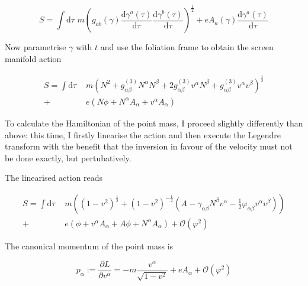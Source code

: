 \documentclass[11pt]{article}
\begin{document}
\begin{equation}
	S = \int \mathrm{d}\tau  \, \, 
	m \left( 
	g_{a b}\left( \gamma \right)
	\frac{\mathrm{d} \gamma^a\left( \tau \right) }{\mathrm{d}\tau}
	\frac{\mathrm{d} \gamma^b\left( \tau \right) }{\mathrm{d}\tau} \right)^{\frac{1}{2}}
	+ e A_a \left( \gamma  \right) 
	\frac{\mathrm{d} \gamma^a\left( \tau \right) }{\mathrm{d}\tau} 
\end{equation}

Now parametrise $\gamma$ with $t$ and use the foliation frame to obtain the screen manifold action

\begin{equation}
\begin{split}
	S = \int \mathrm{d}\tau  \, \, 
	& m \left( 
	N^2 + g^{(3)}_{\alpha \beta} N^{\alpha} N^{\beta}
	+ 2 g^{(3)}_{\alpha \beta} v^\alpha N^\beta + g^{(3)}_{\alpha \beta} v^\alpha v^\beta 
	\right)^{\frac{1}{2}} \\
	+ \, & e \left( N \phi + N^\alpha A_\alpha + v^\alpha A_\alpha \right)
\end{split}
\end{equation}

To calculate the Hamiltonian of the point mass, I proceed slightly differently than above: this time, I firstly linearise the action and then execute the Legendre transform with the benefit that the inversion in favour of the velocity must not be done exactly, but pertubatively.

The linearised action reads

\begin{equation}
\begin{split}
	S = \int \mathrm{d}\tau  \, \, 
	& m \left(
	\left( 1 - v^2 \right)^{\frac{1}{2}}
	+ \left( 1 - v^2 \right)^{- \frac{1}{2}}
	\left( A - \gamma_{\alpha \beta} N^\beta v^\alpha - \frac{1}{2} \varphi_{\alpha \beta} v^\alpha v^\beta \right)
	\right)\\
	+ \, \, & e \left( \phi + v^\alpha A_\alpha + A \phi + N^\alpha A_\alpha \right) + \mathcal{O} \left(\varphi^2 \right)
\end{split}
\end{equation}

The canonical momentum of the point mass is

\begin{equation}
	p_\alpha := \frac{ \partial L}{\partial v^\alpha}
	= -m \frac{v^\alpha}{\sqrt{1- v^2}} + e A_\alpha	 
	+ \mathcal{O} \left(\varphi^2 \right)
\end{equation}
\end{document}

